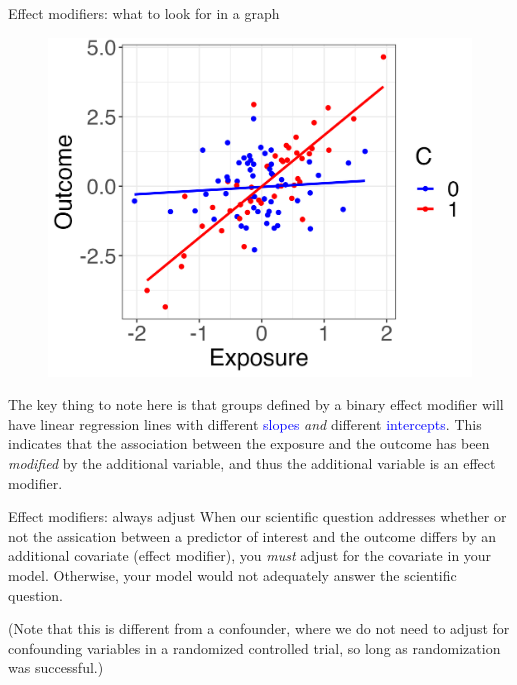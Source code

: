 \documentclass[10pt,t]{beamer}
\begin{document}
\begin{frame}{Effect modifiers: what to look for in a graph}

\begin{figure}
	\centering \includegraphics[scale=0.4]{p4.png}
\end{figure}

\vspace{0.3cm}

The key thing to note here is that groups defined by a binary effect modifier will have linear regression lines with different \textcolor{blue}{slopes} \textit{and} different \textcolor{blue}{intercepts}. This indicates that the association between the exposure and the outcome has been \textit{modified} by the additional variable, and thus the additional variable is an effect modifier.

\end{frame}

\begin{frame}{Effect modifiers: always adjust}
When our scientific question addresses whether or not the assication between a predictor of interest and the outcome differs by an additional covariate (effect modifier), you \textit{must} adjust for the covariate in your model. Otherwise, your model would not adequately answer the scientific question.

\vspace{0.3cm}

(Note that this is different from a confounder, where we do not need to adjust for confounding variables in a randomized controlled trial, so long as randomization was successful.)


\end{frame}
\end{document}
